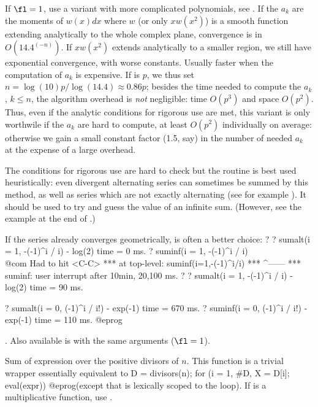 If $\fl=1$, use a variant with more complicated polynomials, see
. If the $a_k$ are the moments of $w(x)dx$ where $w$
(or only $xw(x^2)$) is a smooth function extending analytically to the whole
complex plane, convergence is in $O(14.4^(-n))$. If $xw(x^2)$ extends
analytically to a smaller region, we still have exponential convergence,
with worse constants. Usually faster when the computation of $a_k$ is
expensive. If  is $p$, we thus set
$n = \log(10)p/\log(14.4)\approx 0.86 p$; besides the time needed to
compute the $a_k$, $k\leq n$, the algorithm overhead is \emph{not}
negligible: time $O(p^3)$ and space $O(p^2)$. Thus, even if the analytic
conditions for rigorous use are met, this variant is only worthwile if the
$a_k$ are hard to compute, at least $O(p^2)$ individually on average:
otherwise we gain a small constant factor (1.5, say) in the number of
needed $a_k$ at the expense of a large overhead.

The conditions for rigorous use are hard to check but the routine is best used
heuristically: even divergent alternating series can sometimes be summed by
this method, as well as series which are not exactly alternating (see for
example ). It should be used to try and guess the
value of an infinite sum. (However, see the example at the end of
.)

If the series already converges geometrically,
 is often a better choice:
\bprog
? 
? sumalt(i = 1, -(-1)^i / i)  - log(2)
time = 0 ms.
? suminf(i = 1, -(-1)^i / i)   \\@com Had to hit <C-C>
  ***   at top-level: suminf(i=1,-(-1)^i/i)
  ***                                ^------
  *** suminf: user interrupt after 10min, 20,100 ms.
? 
? sumalt(i = 1, -(-1)^i / i)  - log(2)
time = 90 ms.

? sumalt(i = 0, (-1)^i / i!) - exp(-1)
time = 670 ms.
? suminf(i = 0, (-1)^i / i!) - exp(-1)
time = 110 ms.
@eprog

. Also
available is  with the same arguments ($\fl = 1$).

\label{se:sumdiv}
Sum of expression  over the positive divisors of $n$.
This function is a trivial wrapper essentially equivalent to
\bprog
  D = divisors(n);
  for (i = 1, #D, X = D[i]; eval(expr))
@eprog\noindent (except that  is lexically scoped to the 
loop). If  is a multiplicative function, use .

